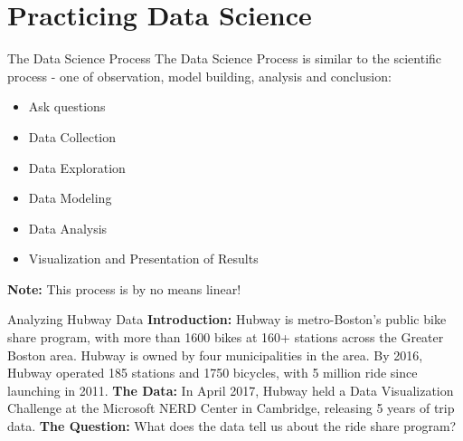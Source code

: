 \documentclass[12pt,t]{beamer}
\begin{document}
\section{Practicing Data Science}

\begin{frame}{The Data Science Process} 
The Data Science Process is similar to the scientific process - one of observation, model building, analysis and conclusion:
\vskip0.2cm
\begin{itemize}
\item  Ask questions
\item  Data Collection
\item  Data Exploration
\item  Data Modeling
\item  Data Analysis
\item  Visualization and Presentation of Results 
\end{itemize}
\vskip0.2cm
\textbf{Note:} This process is by no means linear!
\end{frame}

\begin{frame}{Analyzing Hubway Data} 
\vskip-0.2cm
\textbf{Introduction: } Hubway is metro-Boston's public bike share program, with more than 1600 bikes at 160+ stations across the Greater Boston area. Hubway is owned by four municipalities in the area.
\vskip0.2cm
By 2016, Hubway operated 185 stations and 1750 bicycles, with 5 million ride since launching in 2011. 
\vskip0.4cm
\textbf{The Data: } In April 2017, Hubway held a Data Visualization Challenge at the Microsoft NERD Center in Cambridge, releasing 5 years of trip data.
\vskip0.4cm
\textbf{The Question: } What does the data tell us about the ride share program?
\end{frame}
\end{document}
